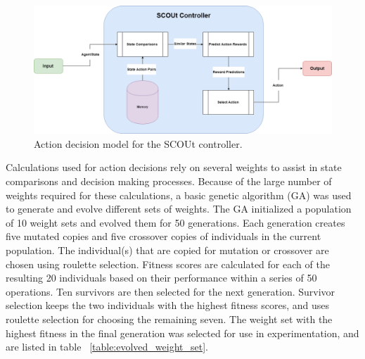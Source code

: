 \begin{figure}[h]
  \includegraphics[width=1.0\columnwidth]{Figures/SCOUt_action_decision_model.png}
  \caption{Action decision model for the SCOUt controller.}
  \label{fig:SCOUt_decision_model}
\end{figure}

Calculations used for action decisions rely on several weights to assist in state comparisons and decision making processes.
Because of the large number of weights required for these calculations, a basic genetic algorithm (GA) was used to generate and evolve different sets of weights.
The GA initialized a population of 10 weight sets and evolved them for 50 generations.
Each generation creates five mutated copies and five crossover copies of individuals in the current population.
The individual(s) that are copied for mutation or crossover are chosen using roulette selection. 
Fitness scores are calculated for each of the resulting 20 individuals based on their performance within a series of 50 operations.
Ten survivors are then selected for the next generation.
Survivor selection keeps the two individuals with the highest fitness scores, and uses roulette selection for choosing the remaining seven.
The weight set with the highest fitness in the final generation was selected for use in experimentation, and are listed in table ~\ref{table:evolved_weight_set}.


